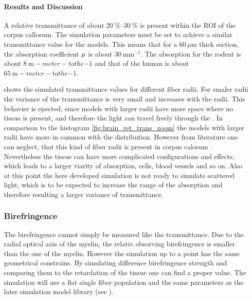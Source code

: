 \paragraph{Results and Discussion}
A relative transmittance of about $\SIrange{20}{30}{\percent}$ is present within the \ac{ROI} of the corpus callosum.
The simulation parameters must be set to achieve a similar transmittance value for the models.
This means that for a $\SI{60}{\micro\meter}$ thick section, the absorption coefficient $\textnormal{$\mu$}{}$ is about $\SI{30}{\milli\meter\tothe{-1}}$.
The absorption for the rodent is about $\SI{8}{\milli-meter-tothe{-1}}$ and that of the human is about $\SI{65}{\milli-meter-tothe{-1}}$.
\par
%
 shows the simulated transmittance values for different fiber radii.
For smaler radii the variance of the transmittance is very small \dummy{} and increases with the radii.
This behavier is epected, since models with larger radii have more space where no tissue is present, and therefore the light can travel freely through the .
In comparison to the histogram \cref{fig:brain_ret_trans_zoom} the models with larger radii have more in common with the distribution.
However from literature one can neglect, that this kind of fiber radii is present in corpus calosum \dummy{}.
Nevertheless the tissue can have more complicated configurations and effects, which leads to a larger viarity of absorption, \eg{} cells, blood vessels and so on.
Also at this point the here developed simulation is not ready to simulate scattered light, which is to be expected to increase the range of the absorption and therefore resulting a larger variance of transmittance.
%
%
%
\subsubsection{Birefringence}
%
The birefringence cannot simply be measured like the transmittance.
Due to the radial optical axis of the myelin, the relativ obsorving birefringence is smaller than the one of the myelin.
However the simulation up to a point has the same geometrical constrains.
By simulating difference birefringence strength and comparing them to the retardation of the tissue one can find a proper value.
The simulation will use a flat single fiber population and the same parameters as the later simulation model library (see \dummy{}).
%

